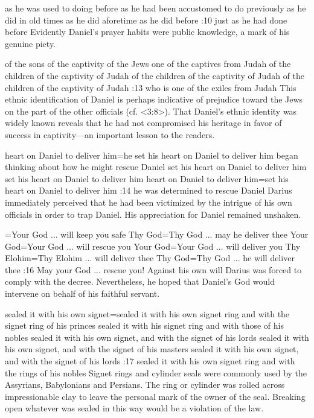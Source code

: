     {as he was used to doing before} %
    {as he had been accustomed to do previously} %
    {as he did in old times} %
    {as he did aforetime} %
    {as he did before} %
:10 {just as he had done before} Evidently Daniel's prayer habits were public knowledge, a mark of
his genuine piety. 

    {of the sons of the captivity of the Jews} %
    {one of the captives from Judah} %
    {of the children of the captivity of Judah} %
    {of the children of the captivity of Judah} %
    {of the children of the captivity of Judah} %
:13 {who is one of the exiles from Judah} This ethnic identification of Daniel is perhaps indicative
of prejudice toward the Jews on the part of the other officials (cf. <3:8>). That Daniel's ethnic
identity was widely known reveals that he had not compromised his  
heritage in favor of success in captivity—an important lesson to 
the readers.

    {heart on Daniel to deliver him}={he set his heart on Daniel to deliver him} %
    {began thinking about how he might rescue Daniel} %
    {set his heart on Daniel to deliver him} %
    {set his heart on Daniel to deliver him} %
    {heart on Daniel to deliver him}={set his heart on Daniel to deliver him} %
:14 {he was determined to rescue Daniel} Darius immediately 
perceived that he had been victimized by the intrigue of his own 
officials in order to trap Daniel. His appreciation for Daniel remained unshaken.

={Your God ... will keep you safe} %
    {Thy God}={Thy God ... may he deliver thee} %
    {Your God}={Your God ... will rescue you} %
    {Your God}={Your God ... will deliver you} %
    {Thy Elohim}={Thy Elohim ... will deliver thee} %
    {Thy God}={Thy God ... he will deliver thee} %
:16 {May your God ... rescue you!} Against his own will Darius 
was forced to comply with the decree. Nevertheless, he hoped 
that Daniel's God would intervene on behalf of his faithful servant. 

    {sealed it with his own signet}={sealed it with his own signet ring and with the signet ring of his princes} %
    {sealed it with his signet ring and with those of his nobles} %
    {sealed it with his own signet, and with the signet of his lords} %
    {sealed it with his own signet, and with the signet of his masters} %
    {sealed it with his own signet, and with the signet of his lords} %
:17 {sealed it with his own signet ring and with the rings of 
his nobles} Signet rings and cylinder seals were commonly used by 
the Assyrians, Babylonians and Persians. The ring or cylinder was 
rolled across impressionable clay to leave the personal mark of the 
owner of the seal. Breaking open whatever was sealed in this way 
would be a violation of the law.

